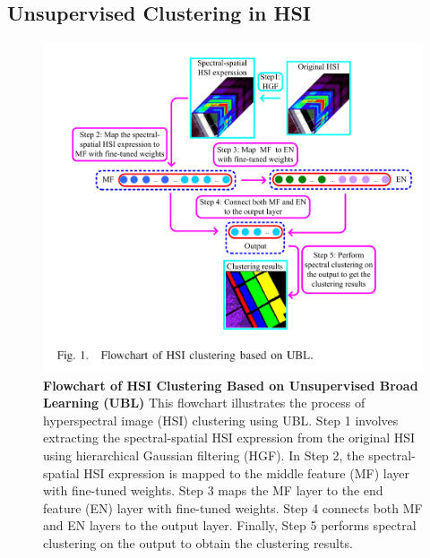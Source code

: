 \documentclass[10pt,svgnames,fragile]{beamer}
\begin{document}
\subsection{Unsupervised Clustering in HSI}
\begin{frame}{}
\tiny
\begin{figure}
    \centering
            \centering
            \includegraphics[width=0.62\linewidth]{kong_chat.png}
            \caption{\textbf{Flowchart of HSI Clustering Based on Unsupervised Broad Learning (UBL)} This flowchart illustrates the process of hyperspectral image (HSI) clustering using UBL. Step 1 involves extracting the spectral-spatial HSI expression from the original HSI using hierarchical Gaussian filtering (HGF). In Step 2, the spectral-spatial HSI expression is mapped to the middle feature (MF) layer with fine-tuned weights. Step 3 maps the MF layer to the end feature (EN) layer with fine-tuned weights. Step 4 connects both MF and EN layers to the output layer. Finally, Step 5 performs spectral clustering on the output to obtain the clustering results.\cite{kongHyperspectralImageClustering2019}}
    \label{fig:kong_chart}
\end{figure}
\end{frame}
\end{document}
